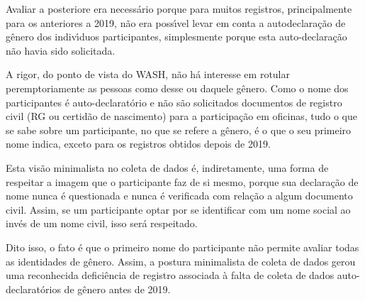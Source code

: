 \documentclass[
12pt,		%
openright,	%
twoside,  %
a4paper,			%
chapter=TITLE,		%
english,			%
french,				%
spanish,			%
brazil				%
]{USPSC-classe/USPSC}
\begin{document}
Avaliar a posteriore era necess\'ario porque para muitos registros, principalmente para os anteriores a 2019, n\~ao era poss\'{\i}vel levar em conta a autodeclara\c{c}\~ao de g\^enero dos indiv\'{\i}duos participantes, simplesmente porque esta auto-declara\c{c}\~ao n\~ao havia sido solicitada.

















A rigor, do ponto de vista do WASH, n\~ao h\'a interesse em rotular peremptoriamente as pessoas como desse ou daquele g\^enero. Como o nome dos participantes \'e auto-declarat\'orio e n\~ao s\~ao solicitados documentos de registro civil (RG ou certid\~ao de nascimento) para a participa\c{c}\~ao em oficinas, tudo o que se sabe sobre um participante, no que se refere a g\^enero, \'e o que o seu primeiro nome indica, exceto para os registros obtidos depois de 2019.

















Esta vis\~ao minimalista no coleta de dados \'e, indiretamente, uma forma de respeitar a imagem que o participante faz de si mesmo, porque sua declara\c{c}\~ao de nome nunca \'e questionada e nunca \'e verificada com rela\c{c}\~ao a algum documento civil. Assim, se um participante optar por se identificar com um nome social ao inv\'es de um nome civil, isso ser\'a respeitado.

















Dito isso, o fato \'e que o primeiro nome do participante n\~ao permite avaliar todas as identidades de g\^enero. Assim, a postura minimalista de coleta de dados gerou uma reconhecida defici\^encia de registro associada \`a falta de coleta de dados auto-declarat\'orios de g\^enero antes de 2019.
\end{document}
